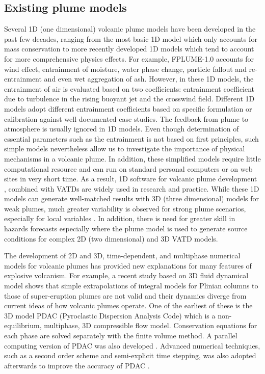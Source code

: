 \documentclass[gmd, manuscript]{copernicus}
\begin{document}
\subsection{Existing plume models}
Several 1D (one dimensional) volcanic plume models have been developed in the past few decades, ranging from the most basic 1D model \citep{woods1988fluid} which only accounts for mass conservation to more recently developed 1D models  \citep{bursik2001effect, mastin2007user, degruyter2012improving, woodhouse2013interaction, devenish2013using, de2015plume, folch2016fplume, pouget2016sensitivity} which tend to account for more comprehensive physics effects. 
For example, FPLUME-1.0 \citep{folch2016fplume} accounts for wind effect, entrainment of moisture, water phase change, particle fallout and re-entrainment and even wet aggregation of ash. However, in these 1D models, the entrainment of air is evaluated based on two coefficients: entrainment coefficient due to turbulence in the rising buoyant jet and the crosswind field. Different 1D models adopt different entrainment coefficients based on specific formulation or calibration against well-documented case studies. The feedback from plume to atmosphere is usually ignored in 1D models. Even though determination of essential parameters such as the entrainment is not based on first principles, such simple models nevertheless allow us to investigate the importance of physical mechanisms in a volcanic plume. In addition, these simplified models require little computational resource and can run on standard personal computers or on web sites in very short time. As a result, 1D software for volcanic plume development \citep[such as][]{267, 1194, 3541}, combined with VATDs \citep[such as][]{114, draxler2015hysplit} are widely used in research and practice. While these 1D models can generate well-matched results with 3D (three dimensional) models for weak plumes, much greater variability is observed for strong plume scenarios, especially for local variables \citep{costa2016results}. In addition, there is need for greater skill in hazards forecasts especially where the plume model is used to generate source conditions for complex 2D (two dimensional) and 3D VATD models.

The development of 2D and 3D, time-dependent, and multiphase numerical models for volcanic plumes has provided new explanations for many features of explosive volcanism. For example, a recent study based on 3D fluid dynamical model \citep{costa2018understanding} shows that simple extrapolations of integral models for Plinian columns to those of super-eruption plumes are not valid and their dynamics diverge from current ideas of how volcanic plumes operate. One of the earliest of these is the 3D model PDAC (Pyroclastic Dispersion Analysis Code) \citep{neri2003multiparticle}  which is a non-equilibrium, multiphase, 3D compressible flow model. Conservation equations for each phase are solved separately with the finite volume method. A parallel computing version of PDAC was also developed \citep{ongaro2007parallel}. Advanced numerical techniques, such as a second order scheme and semi-explicit time stepping, was also adopted afterwards to improve the accuracy of PDAC \citep{carcano2013semi}. 
\end{document}
